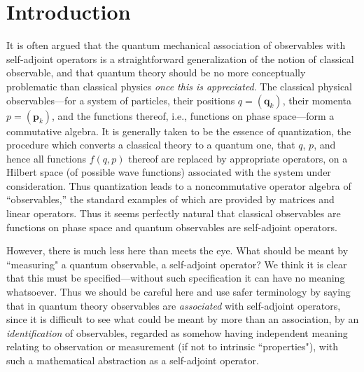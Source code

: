 \documentclass[12pt]{article}
\begin{document}
\maketitle

\newpage
\tableofcontents

\newpage

\section{Introduction}
\setcounter{equation}{0}

It is often argued that the quantum mechanical association of
observables with self-adjoint operators is a straightforward
generalization of the notion of classical observable, and that quantum
theory should be no more conceptually problematic than classical
physics {\it once this is appreciated}.  The classical physical
observables---for a system of particles, their positions
$q=(\mathbf{q}_k)$, their momenta $p=(\mathbf{p}_k)$, and the
functions thereof, i.e., functions on phase space---form a commutative
algebra.  It is generally taken to be the essence of quantization, the
procedure which converts a classical theory to a quantum one, that
\(q\), \(p\), and hence all functions \(f(q,p)\) thereof are replaced
by appropriate operators, on a Hilbert space (of possible wave
functions) associated with the system under consideration.  Thus
quantization leads to a noncommutative operator algebra of
``observables,'' the standard examples of which are provided by
matrices and linear operators.  Thus it seems perfectly natural that
classical observables are functions on phase space and quantum
observables are self-adjoint operators.

However, there is much less here than meets the eye.  What should be
meant by ``measuring" a quantum observable, a self-adjoint operator?
We think it is clear that this must be specified---without such
specification it can have no meaning whatsoever. Thus we should be
careful here and use safer terminology by saying that in quantum
theory observables are {\it associated} with self-adjoint operators,
since it is difficult to see what could be meant by more than an
association, by an {\it identification} of observables, regarded as
somehow having independent meaning relating to observation or
measurement (if not to intrinsic ``properties"), with such a
mathematical abstraction as a self-adjoint operator.
\end{document}
